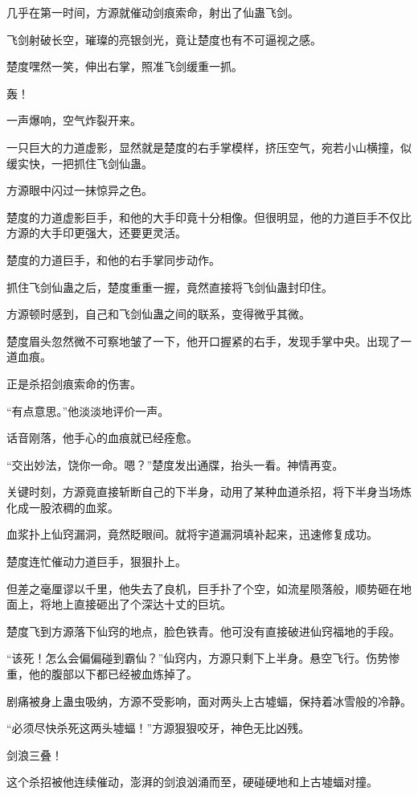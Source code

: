 \begin{this_body}
几乎在第一时间，方源就催动剑痕索命，射出了仙蛊飞剑。

飞剑射破长空，璀璨的亮银剑光，竟让楚度也有不可逼视之感。

楚度嘿然一笑，伸出右掌，照准飞剑缓重一抓。

轰！

一声爆响，空气炸裂开来。

一只巨大的力道虚影，显然就是楚度的右手掌模样，挤压空气，宛若小山横撞，似缓实快，一把抓住飞剑仙蛊。

方源眼中闪过一抹惊异之色。

楚度的力道虚影巨手，和他的大手印竟十分相像。但很明显，他的力道巨手不仅比方源的大手印更强大，还要更灵活。

楚度的力道巨手，和他的右手掌同步动作。

抓住飞剑仙蛊之后，楚度重重一握，竟然直接将飞剑仙蛊封印住。

方源顿时感到，自己和飞剑仙蛊之间的联系，变得微乎其微。

楚度眉头忽然微不可察地皱了一下，他开口握紧的右手，发现手掌中央。出现了一道血痕。

正是杀招剑痕索命的伤害。

“有点意思。”他淡淡地评价一声。

话音刚落，他手心的血痕就已经痊愈。

“交出妙法，饶你一命。嗯？”楚度发出通牒，抬头一看。神情再变。

关键时刻，方源竟直接斩断自己的下半身，动用了某种血道杀招，将下半身当场炼化成一股浓稠的血浆。

血浆扑上仙窍漏洞，竟然眨眼间。就将宇道漏洞填补起来，迅速修复成功。

楚度连忙催动力道巨手，狠狠扑上。

但差之毫厘谬以千里，他失去了良机，巨手扑了个空，如流星陨落般，顺势砸在地面上，将地上直接砸出了个深达十丈的巨坑。

楚度飞到方源落下仙窍的地点，脸色铁青。他可没有直接破进仙窍福地的手段。

“该死！怎么会偏偏碰到霸仙？”仙窍内，方源只剩下上半身。悬空飞行。伤势惨重，他的腹部以下都已经被血炼掉了。

剧痛被身上蛊虫吸纳，方源不受影响，面对两头上古墟蝠，保持着冰雪般的冷静。

“必须尽快杀死这两头墟蝠！”方源狠狠咬牙，神色无比凶残。

剑浪三叠！

这个杀招被他连续催动，澎湃的剑浪汹涌而至，硬碰硬地和上古墟蝠对撞。


\end{this_body}
